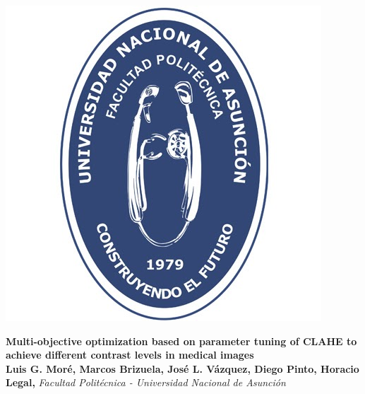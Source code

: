 \documentclass[a0,landscape,spanish,20pt]{a0poster}
\begin{document}

 
\begin{minipage}[b]{1\linewidth}
\begin{minipage}{0.08\linewidth}
\includegraphics[width=1\columnwidth]{figures/photo.jpg}
\end{minipage}
\begin{minipage}{0.8\linewidth}
\begin{shaded}
\centering
\Huge \color{White}  \textbf{Multi-objective optimization based on parameter tuning of CLAHE to achieve different contrast levels in medical images}\\ [0.5cm]%
                                             \Large \textbf{Luis G. Moré, Marcos Brizuela, José L. Vázquez, Diego Pinto, Horacio Legal, } 
\Large \textit{Facultad Politécnica - Universidad Nacional de Asunción}

\end{shaded}
\end{minipage}
\end{minipage}
\end{document}
